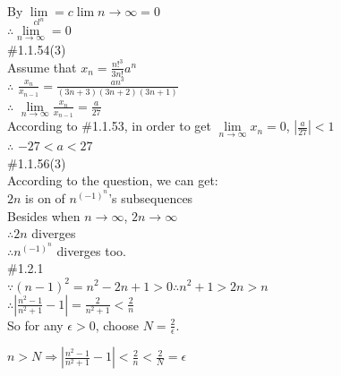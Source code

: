 \documentclass{article}
\begin{document}
By $\lim \limits_{cl^n}=c\lim \limits{n \to \infty}=0$\\

$\therefore$\qquad$\lim \limits_{n \to \infty} = 0$\\

\textcolor[rgb]{0.00,0.00,0.50}{\#1.1.54(3)}\\

Assume that $x_n=\frac{{n!}^3}{3n!}a^n$\\

$\therefore$ \qquad $\frac{x_n}{x_{n-1}}=\frac{an^3}{(3n+3)(3n+2)(3n+1)}$\\

$\therefore$ \qquad $\lim \limits_{n \to \infty}{\frac{x_n}{x_{n-1}}}=\frac{a}{27}$\\

According to \#1.1.53, in order to get $\lim \limits_{n \to \infty}x_n = 0$, $\left|\frac{a}{27}\right|<1$\\

$\therefore$ \qquad $-27<a<27$\\

\textcolor[rgb]{0.00,0.00,0.50}{\#1.1.56(3)}\\

According to the question, we can get:\\

$2n$ is on of $n^{(-1)^n}$'s subsequences\\

Besides when $n \to \infty$, $2n \to \infty$\\

$\therefore$\qquad$2n$ diverges\\

$\therefore$\qquad$n^{(-1)^n}$ diverges too.\\

\textcolor[rgb]{0.00,0.00,0.50}{\#1.2.1}\\

$\because$\qquad$(n-1)^2=n^2-2n+1>0$\qquad$\therefore$\qquad$n^2+1>2n>n$\\

$\therefore$\qquad$\left|\frac{n^2-1}{n^2+1}-1\right|=\frac{2}{n^2+1}<\frac{2}{n}$\\

So for any $\epsilon>0$, choose $N=\frac{2}{\epsilon}$.\\

\centerline{$n>N\Rightarrow\left|\frac{n^2-1}{n^2+1}-1\right|<\frac{2}{n}<\frac{2}{N}=\epsilon$}
\end{document}
